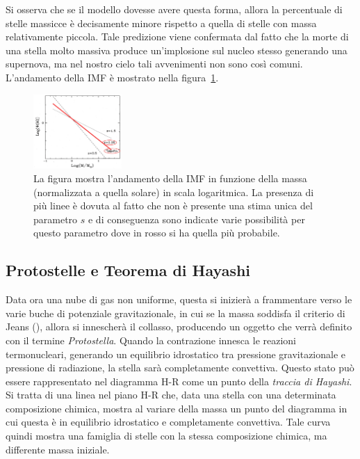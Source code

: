 Si osserva che se il modello dovesse avere questa forma, allora la percentuale di stelle massicce è decisamente minore rispetto a quella di stelle con massa relativamente piccola. Tale predizione viene confermata dal fatto che la morte di una stella molto massiva produce un'implosione sul nucleo stesso generando una supernova, ma nel nostro cielo tali avvenimenti non sono così comuni. L'andamento della IMF è mostrato nella figura~\ref{fig:IMF}.

\begin{figure}
    \centering
    \includegraphics[width = 0.3\textwidth]{immagini/IMF.png}
    \caption{La figura mostra l'andamento della IMF in funzione della massa (normalizzata a quella solare) in scala logaritmica. La presenza di più linee è dovuta al fatto che non è presente una stima unica del parametro $s$ e di conseguenza sono indicate varie possibilità per questo parametro dove in rosso si ha quella più probabile.}\label{fig:IMF}
\end{figure}
\subsection{Protostelle e Teorema di Hayashi}

Data ora una nube di gas non uniforme, questa si inizierà a frammentare verso le varie buche di potenziale gravitazionale, in cui se la massa  soddisfa il criterio di Jeans (), allora si innescherà il collasso, producendo un oggetto che verrà definito con il termine \textit{Protostella}. Quando la contrazione innesca le reazioni termonucleari, generando un equilibrio idrostatico tra pressione gravitazionale e pressione di radiazione, la stella sarà completamente convettiva. Questo stato può essere rappresentato nel diagramma H-R come un punto della \textit{traccia di Hayashi}. Si tratta di una linea nel piano H-R che, data una stella con una determinata composizione chimica, mostra al variare della massa un punto del diagramma in cui questa è in equilibrio idrostatico e completamente convettiva. Tale curva quindi mostra una famiglia di stelle con la stessa composizione chimica, ma differente massa iniziale.

